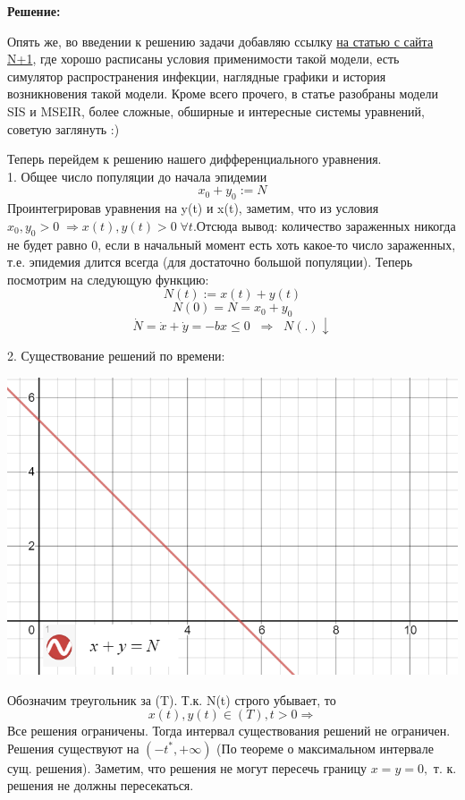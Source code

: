 \documentclass[10pt]{report}
\begin{document}
\textbf{Решение:}

Опять же, во введении к решению задачи добавляю ссылку \href{https://nplus1.ru/material/2019/12/26/epidemic-math}{на статью с сайта N+1}, где хорошо расписаны условия применимости такой модели, есть симулятор распространения инфекции, наглядные графики и история возникновения такой модели. Кроме всего прочего, в статье разобраны модели SIS и MSEIR, более сложные, обширные и интересные системы уравнений, советую заглянуть :)

Теперь перейдем к решению нашего дифференциального уравнения.\\
1. Общее число популяции до начала эпидемии
\[x_0+y_0:=N\]
Проинтегрировав уравнения на y(t) и x(t), заметим, что из условия $x_0,y_0>0\;\Rightarrow x(t),y(t)>0\; \forall t$.Отсюда вывод: количество зараженных никогда не будет равно 0, если в начальный момент есть хоть какое-то число зараженных, т.е. эпидемия длится всегда (для достаточно большой популяции). Теперь посмотрим на следующую функцию:
\[N(t):=x(t)+y(t)\]
\[N(0)=N=x_0+y_0 \]
\[\dot{N}=\dot{x}+\dot{y}=-bx\leq 0 \;\; \Rightarrow \;\; N(.)   \downarrow \]

2. Существование решений по времени:
\begin{center}
{\includegraphics[scale=0.48]{graph13.1.png}} 
\end{center}
Обозначим треугольник за (T). Т.к. N(t) строго убывает, то 
\[x(t), y(t) \in (T), t>0 \Rightarrow\]
Все решения ограничены. Тогда интервал существования решений не ограничен. Решения существуют на $(-t^*, +\infty)$ (По теореме о максимальном интервале сущ. решения). Заметим, что решения не могут пересечь границу $x=y=0,$ т. к. решения не должны пересекаться.
\end{document}
